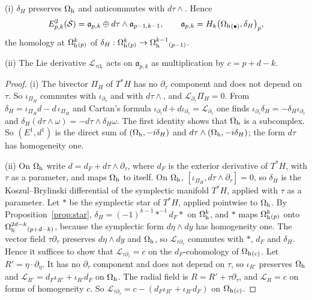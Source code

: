 \begin{lemma}\label{su:lem:E2S}
\textup{(i)} \(\delta_H\) preserves \(\Omega_{\mathrm h}\) and anticommutes with
\(d\tau\wedge\). Hence
\[
 E^2_{p,k}(\mathcal S)=\mathfrak a_{p,k}\oplus d\tau\wedge\mathfrak
 a_{p-1,k-1},\qquad\mathfrak a_{p,k}=H_k\bigl(\Omega_{\mathrm h}{}_{(\bullet)},
 \delta_H\bigr)_{p},
\]
the homology at \(\Omega_{\mathrm h}^k{}_{(p)}\) of \(\delta_H:\Omega_{\mathrm h}^k{}_{(p)}\to
\Omega_{\mathrm h}^{k-1}{}_{(p-1)}\).

\textup{(ii)} The Lie derivative \(\mathcal L_{\tau\partial_\tau}\) acts
on \(\mathfrak a_{p,k}\) as multiplication by \(c=p+d-k\).
\end{lemma}

\begin{proof}
(i) The bivector \(\Pi_H\) of \(T^*H\) has no \(\partial_\tau\)
component and does not depend on \(\tau\). So \(\iota_{\Pi_H}\)
commutes with \(\iota_{\partial_\tau}\) and with \(d\tau\wedge\), and
\(\mathcal L_{\partial_\tau}\Pi_H=0\). From
\(\delta_H=\iota_{\Pi_H}d-d\,\iota_{\Pi_H}\) and Cartan's formula
\(\iota_{\partial_\tau}d+d\iota_{\partial_\tau}=\mathcal
L_{\partial_\tau}\) one finds \(\iota_{\partial_\tau}\delta_H=
-\delta_H\iota_{\partial_\tau}\) and \(\delta_H(d\tau\wedge\omega)=
-d\tau\wedge\delta_H\omega\). The first identity shows that \(\Omega_{\mathrm h}\) is a
subcomplex. So \((E^1,d^1)\) is the direct sum of \((\Omega_{\mathrm h},-i\delta_H)\) and
\(d\tau\wedge(\Omega_{\mathrm h},-i\delta_H)\); the form \(d\tau\) has homogeneity
one.

(ii) On \(\Omega_{\mathrm h}\) write \(d=d_F+d\tau\wedge\partial_\tau\), where \(d_F\)
is the exterior derivative of \(T^*H\), with \(\tau\) as a parameter, and
maps \(\Omega_{\mathrm h}\) to itself. On \(\Omega_{\mathrm h}\), \([\iota_{\Pi_H},d\tau\wedge
\partial_\tau]=0\), so \(\delta_H\) is the Koszul--Brylinski differential
of the symplectic manifold \(T^*H\), applied with \(\tau\) as a
parameter. Let \(*\) be the symplectic star of \(T^*H\), applied
pointwise to \(\Omega_{\mathrm h}\). By Proposition~\ref{prop:star}, \(\delta_H=
(-1)^{k-1}*^{-1}d_F*\) on \(\Omega_{\mathrm h}^k\), and \(*\) maps
\(\Omega_{\mathrm h}^k{}_{(p)}\) onto \(\Omega_{\mathrm h}^{2d-k}{}_{(p+d-k)}\), because the
symplectic form \(d\eta\wedge dy\) has homogeneity one. The vector field
\(\tau\partial_\tau\) preserves \(d\eta\wedge dy\) and \(\Omega_{\mathrm h}\), so
\(\mathcal L_{\tau\partial_\tau}\) commutes with \(*\), \(d_F\) and
\(\delta_H\). Hence it suffices to show that \(\mathcal
L_{\tau\partial_\tau}=c\) on the \(d_F\)-cohomology of \(\Omega_{\mathrm h}{}_{(c)}\).
Let \(R'=\eta\cdot\partial_\eta\). It has no \(\partial_\tau\) component
and does not depend on \(\tau\), so \(\iota_{R'}\) preserves \(\Omega_{\mathrm h}\)
and \(\mathcal L_{R'}=d_F\iota_{R'}+\iota_{R'}d_F\) on \(\Omega_{\mathrm h}\). The radial
field is \(R=R'+\tau\partial_\tau\), and \(\mathcal L_R=c\) on forms of
homogeneity \(c\). So \(\mathcal L_{\tau\partial_\tau}=c-(d_F\iota_{R'}+
\iota_{R'}d_F)\) on \(\Omega_{\mathrm h}{}_{(c)}\).
\end{proof}

